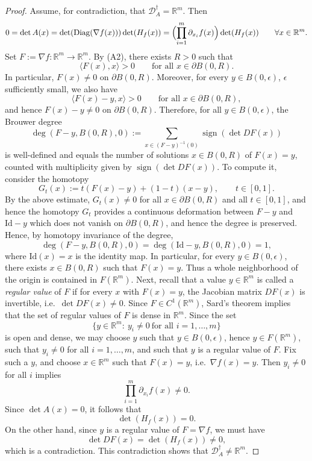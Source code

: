 \documentclass[11pt, a4paper,leqno]{amsart}
\newcommand{\Diag}{\operatorname{Diag}}
\theoremstyle{definition}
\numberwithin{equation}{section}
\begin{document}
\begin{proof}
Assume, for contradiction, that $\mathcal D_A^\dagger=\mathbb R^m$. Then
\[
0=\det A(x)
=\det(\Diag(\nabla f(x)))\det(H_f(x))
=\Bigl(\prod_{i=1}^m \partial_{x_i} f(x)\Bigr)\det(H_f(x))
\qquad \forall x\in\mathbb R^m.
\]
Set $F:=\nabla f:\mathbb R^m\to\mathbb R^m$. By \textnormal{(A2)}, there exists $R>0$ such that
\[
\langle F(x),x\rangle >0 \qquad \text{for all }x\in \partial B(0,R).
\]
In particular, $F(x)\neq 0$ on $\partial B(0,R)$. Moreover, for every $y\in B(0,\epsilon)$, $\epsilon$ sufficiently small, we also have
\[
\langle F(x)-y,x\rangle >0 \qquad \text{for all }x\in \partial B(0,R),
\]
and hence $F(x)-y\neq 0$ on $\partial B(0,R)$. Therefore, for all $y\in B(0,\epsilon)$, the Brouwer degree
\[
\deg(F-y,B(0,R),0):=\sum_{x\in (F-y)^{-1}(0)} \operatorname{sign}(\det DF(x))
\]
is well-defined and equals the number of solutions $x \in B(0,R)$ of $F(x)=y$, counted with multiplicity given by $\operatorname{sign}(\det DF(x))$. To compute it, consider the homotopy
\[
G_t(x):=t(F(x)-y)+(1-t)(x-y), \qquad t\in[0,1].
\]
By the above estimate, $G_t(x)\neq 0$ for all $x\in\partial B(0,R)$ and all $t\in[0,1]$, and hence the homotopy $G_t$ provides a continuous deformation between $F-y$ and $\mathrm{Id}-y$ which does not vanish on $\partial B(0,R)$, and hence the degree is preserved. Hence, by homotopy invariance of the degree,
\[
\deg(F-y,B(0,R),0)=\deg(\mathrm{Id}-y,B(0,R),0)=1,
\]
where $\mathrm{Id}(x)=x$ is the identity map. In particular, for every $y\in B(0,\epsilon)$, there exists $x\in B(0,R)$ such that $F(x)=y$. Thus a whole neighborhood of the origin is contained in $F(\mathbb R^m)$. Next, recall that a value $y\in\mathbb R^m$ is called a \emph{regular value} of $F$ if for every $x$ with $F(x)=y$, the Jacobian matrix $DF(x)$ is invertible, i.e.\ $\det DF(x)\neq 0$. Since $F\in C^1(\mathbb R^m)$, Sard's theorem implies that the set of regular values of $F$ is dense in $\mathbb R^m$. Since the set
\[
\{y\in\mathbb R^m:\ y_i\neq 0\ \text{for all }i=1,\dots,m\}
\]
is open and dense, we may choose $y$ such that  $y\in B(0,\epsilon)$, hence $y\in F(\mathbb R^m)$, such that $y_i\neq 0$ for all $i=1,\dots,m$, and such that $y$ is a regular value of $F$. Fix such a $y$, and choose $x\in\mathbb R^m$ such that $F(x)=y$, i.e.\ $\nabla f(x)=y$. Then $y_i\neq 0$ for all $i$ implies
\[
\prod_{i=1}^m \partial_{x_i} f(x)\neq 0.
\]
Since $\det A(x)=0$, it follows that
\[
\det(H_f(x))=0.
\]
On the other hand, since $y$ is a regular value of $F=\nabla f$, we must have
\[
\det DF(x)=\det(H_f(x))\neq 0,
\]
which is a contradiction. This contradiction shows that $\mathcal D_A^\dagger\neq \mathbb R^m$.
\end{proof}
\end{document}
